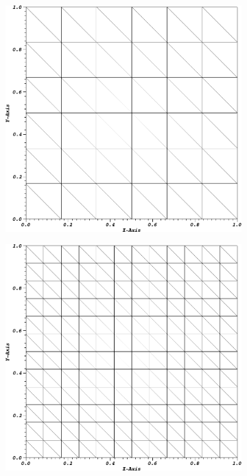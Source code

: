 \begin{figure}
{\begin{subfigure}[b]{0.45\textwidth}
	\end{subfigure}
}
\vspace{2.5mm}
{
	\begin{subfigure}[b]{0.45\textwidth}
		\centering
		\label{subfig::SineMMS_TriMesh00}
		\includegraphics[width=\textwidth]{figures/sec_BF/SineTriMesh_cyc00.png}
	\end{subfigure}
	\hfill
	\begin{subfigure}[b]{0.45\textwidth}
		\centering
		\label{subfig::SineMMS_TriMesh01}
		\includegraphics[width=\textwidth]{figures/sec_BF/SineTriMesh_cyc01.png}

\end{subfigure}}
\end{figure}

